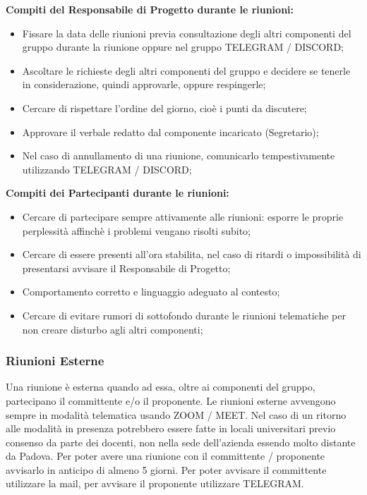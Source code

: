 \textbf{Compiti del Responsabile di Progetto durante le riunioni:}
\begin{itemize}
\item{Fissare la data delle riunioni previa consultazione degli altri componenti del gruppo durante la riunione oppure nel gruppo TELEGRAM / DISCORD;}
\item{Ascoltare le richieste degli altri componenti del gruppo e decidere se tenerle in considerazione, quindi approvarle, oppure respingerle;}
\item{Cercare di rispettare l'ordine del giorno, cioè i punti da discutere;}
\item{Approvare il verbale redatto dal componente incaricato (Segretario);}
\item{Nel caso di annullamento di una riunione, comunicarlo tempestivamente utilizzando TELEGRAM / DISCORD;}
\end{itemize}
\textbf{Compiti dei Partecipanti durante le riunioni:}
\begin{itemize}
\item{Cercare di partecipare sempre attivamente alle riunioni: esporre le proprie perplessità affinchè i problemi vengano risolti subito;}
\item{Cercare di essere presenti all'ora stabilita, nel caso di ritardi o impossibilità di presentarsi avvisare il Responsabile di Progetto;}
\item{Comportamento corretto e linguaggio adeguato al contesto;}
\item{Cercare di evitare rumori di sottofondo durante le riunioni telematiche per non creare disturbo agli altri componenti;}
\end{itemize}

\subsubsection{Riunioni Esterne}
Una riunione è esterna quando ad essa, oltre ai componenti del gruppo, partecipano il committente e/o il proponente.
Le riunioni esterne avvengono sempre in modalità telematica usando ZOOM / MEET. 
Nel caso di un ritorno alle modalità in presenza potrebbero essere fatte in locali universitari previo consenso da parte dei docenti, non nella sede dell'azienda essendo molto distante da Padova.
Per poter avere una riunione con il committente / proponente avvisarlo in anticipo di almeno 5 giorni.
Per poter avvisare il committente utilizzare la mail, per avvisare il proponente utilizzare TELEGRAM.

